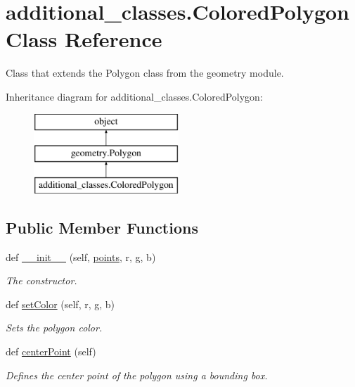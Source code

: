 \hypertarget{classadditional__classes_1_1ColoredPolygon}{}\section{additional\+\_\+classes.\+Colored\+Polygon Class Reference}
\label{classadditional__classes_1_1ColoredPolygon}


Class that extends the Polygon class from the geometry module.  


Inheritance diagram for additional\+\_\+classes.\+Colored\+Polygon\+:\begin{figure}[H]
\begin{center}
\leavevmode
\includegraphics[height=3.000000cm]{classadditional__classes_1_1ColoredPolygon}
\end{center}
\end{figure}
\subsection*{Public Member Functions}
\begin{DoxyCompactItemize}
\item 
\mbox{\label{classadditional__classes_1_1ColoredPolygon_a4500b4e5c51f3a99d80042378c3ccc7a}} 
def \hyperlink{classadditional__classes_1_1ColoredPolygon_a4500b4e5c51f3a99d80042378c3ccc7a}{\+\_\+\+\_\+init\+\_\+\+\_\+} (self, \hyperlink{classgeometry_1_1Polygon_aa0fda1ff74a09b8498bd7d8731b2fbf1}{points}, r, g, b)
\begin{DoxyCompactList}\small\item\em The constructor. \end{DoxyCompactList}\item 
def \hyperlink{classadditional__classes_1_1ColoredPolygon_a8c7c8ef66ef3bfddc0223c109addab48}{set\+Color} (self, r, g, b)
\begin{DoxyCompactList}\small\item\em Sets the polygon color. \end{DoxyCompactList}\item 
def \hyperlink{classadditional__classes_1_1ColoredPolygon_a3ba3e35b383cc6999480057a4d026e71}{center\+Point} (self)
\begin{DoxyCompactList}\small\item\em Defines the center point of the polygon using a bounding box. \end{DoxyCompactList}\end{DoxyCompactItemize}
